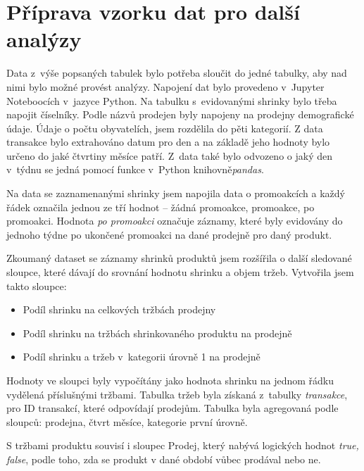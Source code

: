 \section{Příprava vzorku dat pro další analýzy}
\label{sec:priprava}
Data z~výše popsaných tabulek bylo potřeba sloučit do jedné tabulky, aby nad nimi bylo možné provést analýzy. Napojení dat bylo provedeno v~Jupyter Noteboocích v~jazyce Python. Na tabulku s~evidovanými shrinky bylo třeba napojit číselníky. Podle názvů prodejen byly napojeny na prodejny demografické údaje. Údaje o počtu obyvatelích, jsem rozdělila do pěti kategorií. Z data transakce bylo extrahováno datum pro den a na základě jeho hodnoty bylo určeno do jaké čtvrtiny měsíce patří. Z~data také bylo odvozeno o jaký den v~týdnu se jedná pomocí funkce v~Python knihovně\emph{pandas}.

Na data se zaznamenanými shrinky jsem napojila data o promoakcích a každý řádek označila jednou ze tří hodnot -- žádná promoakce, promoakce, po promoakci. Hodnota \emph{po promoakci} označuje záznamy, které byly evidovány do jednoho týdne po ukončené promoakci na dané prodejně pro daný produkt. 


Zkoumaný dataset se záznamy shrinků produktů jsem rozšířila o další sledované sloupce, které dávají do srovnání hodnotu shrinku a objem tržeb. Vytvořila jsem takto sloupce: 
\begin{itemize}
    \itemsep 0em
    \item Podíl shrinku na celkových tržbách prodejny
    \item Podíl shrinku na tržbách shrinkovaného produktu na prodejně
    \item Podíl shrinku a tržeb v~kategorii úrovně 1 na prodejně
\end{itemize}

Hodnoty ve sloupci byly vypočítány jako hodnota shrinku na jednom řádku vydělená příslušnými tržbami. 
    Tabulka tržeb byla získaná z~tabulky \emph{transakce}, pro ID transakcí, které odpovídají prodejům. Tabulka byla agregovaná podle sloupců: prodejna, čtvrt měsíce, kategorie první úrovně.

S tržbami produktu souvisí i sloupec Prodej, který nabývá logických hodnot \emph{true, false}, podle toho, zda se produkt v dané období vůbec prodával nebo ne.


